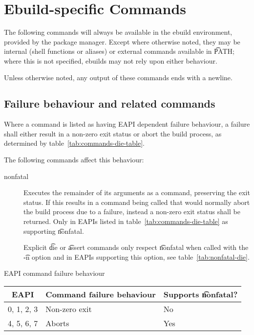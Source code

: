 \section{Ebuild-specific Commands}
\label{sec:pkg-mgr-commands}

The following commands will always be available in the ebuild environment, provided by the package
manager. Except where otherwise noted, they may be internal (shell functions or aliases) or external
commands available in \t{PATH}; where this is not specified, ebuilds may not rely upon either
behaviour.

Unless otherwise noted, any output of these commands ends with a newline.

\subsection{Failure behaviour and related commands}
\label{sec:failure-behaviour}

 Where a command is listed as having EAPI dependent failure behaviour,
a failure shall either result in a non-zero exit status or abort the build process, as determined by
table~\ref{tab:commands-die-table}.

The following commands affect this behaviour:
\begin{description}
\item[nonfatal]  Executes the remainder of its arguments as a command,
    preserving the exit status. If this results in a command being called that would normally abort
    the build process due to a failure, instead a non-zero exit status shall be returned. Only in
    EAPIs listed in table~\ref{tab:commands-die-table} as supporting \t{nonfatal}.

    Explicit \t{die} or \t{assert} commands only respect \t{nonfatal} when called with the \t{-n}
    option and in EAPIs supporting this option, see table~\ref{tab:nonfatal-die}.
\end{description}

\begin{centertable}{EAPI command failure behaviour}
    \label{tab:commands-die-table}
    \begin{tabular}{lll}
      \toprule
      \multicolumn{1}{c}{\textbf{EAPI}} &
      \multicolumn{1}{c}{\textbf{Command failure behaviour}} &
      \multicolumn{1}{c}{\textbf{Supports \t{nonfatal}?}} \\
      \midrule
      0, 1, 2, 3        & Non-zero exit & No  \\
      4, 5, 6, 7        & Aborts        & Yes \\
      \bottomrule
    \end{tabular}
\end{centertable}

